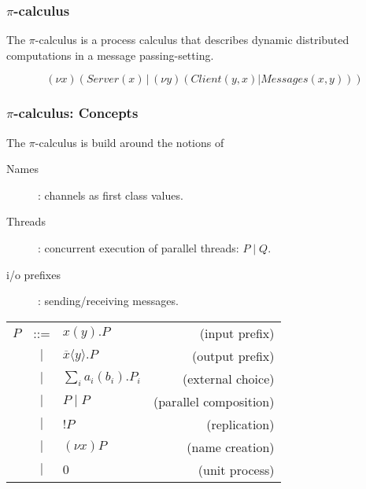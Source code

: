 \documentclass{beamer}
\newcommand{\pical}{$\pi$-calculus}
\newcommand{\tikzMessageNode}[2]{
  \node[draw,thick,fill=white,rectangle,inner sep=0pt,minimum height=0.4cm,minimum width=0.6cm] (#1) at (#2) {};
  \path[draw,-,thick] (#2) -- ++(-0.3, 0.2) (#2) -- ++(0.3, 0.2); 
}
\begin{document}
\begin{frame}
  \frametitle{\pical}
  The $\pi$-calculus \cite{DBLP:journals/iandc/MilnerPW92a,DBLP:journals/iandc/MilnerPW92b}
  is a process calculus that describes dynamic distributed computations in a message passing-setting.

\vspace{10pt}

  \[(\nu x)(Server(x) \,|\, (\nu y)(Client(y,x) | Messages(x,y))) \]
  
  \begin{center}
  \end{center}
  
\end{frame}

\begin{frame}
\frametitle{$\pi$-calculus: Concepts}

The \pical{} is build around the notions of 
\begin{description}
\item[Names]: channels as first class values. %
\item[Threads]: concurrent execution of parallel threads: $P\;|\;Q$.
\item[i/o prefixes]: sending/receiving messages.
\end{description}

\begin{tabular}{lclr}
$P$ & ::= & $x(y).P $                           & (input prefix)\\
    & $|$ & $\overline{x} \langle y \rangle.P $ & (output prefix)\\
    & $|$ & $ \sum_i a_i(b_i).P_i $             & (external choice) \\
    & $|$ & $P\;|\;P $                          & (parallel composition)\\
    & $|$ & $!P $                               & (replication) \\
    & $|$ & $(\nu x)P $                         & (name creation)\\
    & $|$ & $0 $                                & (unit process)
\end{tabular}
\end{frame}
\end{document}
